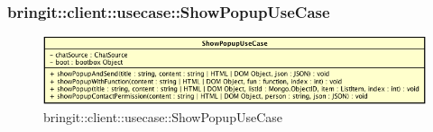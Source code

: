 \subsubsection{bringit::client::usecase::ShowPopupUseCase}

\label{bringit::client::usecase::ShowPopupUseCase}
\begin{figure}[H]
	\centering
	\includegraphics[scale=0.5]{Sezioni/SottosezioniST/img/app/ShowPopupUseCase.png}
	\caption{bringit::client::usecase::ShowPopupUseCase}
\end{figure}

